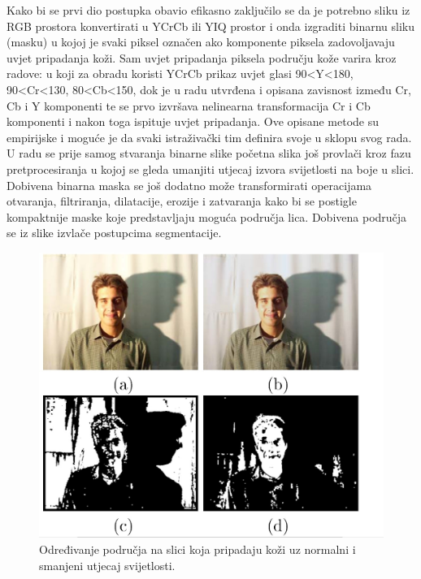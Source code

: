 \documentclass[times, utf8, seminar, numeric]{fer}
\begin{document}
Kako bi se prvi dio postupka obavio efikasno zaključilo se da je potrebno sliku iz RGB prostora konvertirati u YCrCb ili YIQ prostor i onda izgraditi binarnu sliku (masku) u kojoj je svaki piksel označen ako komponente piksela zadovoljavaju uvjet pripadanja koži. Sam uvjet pripadanja piksela području kože varira kroz radove: u \cite{rahman_face_det_gender_svm} koji za obradu koristi YCrCb prikaz uvjet glasi 90<Y<180, 90<Cr<130, 80<Cb<150, dok je u radu \cite{Senior:2002:FDC:513073.513082} utvrđena i opisana zavisnost između Cr, Cb i Y komponenti te se prvo izvršava nelinearna transformacija Cr i Cb komponenti i nakon toga ispituje uvjet pripadanja. Ove opisane metode su empirijske i moguće je da svaki istraživački tim definira svoje u sklopu svog rada. U radu \cite{Senior:2002:FDC:513073.513082} se prije samog stvaranja binarne slike početna slika još provlači kroz fazu pretprocesiranja u kojoj se gleda umanjiti utjecaj izvora svijetlosti na boje u slici. Dobivena binarna maska se  još dodatno može transformirati operacijama otvaranja, filtriranja, dilatacije, erozije i zatvaranja kako bi se postigle kompaktnije maske koje predstavljaju moguća područja lica. Dobivena područja se iz slike izvlače postupcima segmentacije.

\begin{figure}[!htb]
\centering
\includegraphics[width=\textwidth]{raw/skin_det.jpg}
\caption{Određivanje područja na slici koja pripadaju koži uz normalni i smanjeni utjecaj svijetlosti.}
\label{fig:skin_det}
\end{figure}
\end{document}
